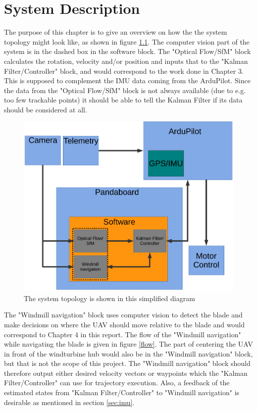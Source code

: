 \chapter{System Description}
The purpose of this chapter is to give an overview on how the the system topology might look like, as shown in figure \ref{overview}. The computer vision part of the system is in the dashed box in the software block. The "Optical Flow/SfM" block calculates the rotation, velocity and/or position and inputs that to the "Kalman Filter/Controller" block, and would correspond to the work done in Chapter 3. This is supposed to complement the IMU data coming from the ArduPilot. Since the data from the "Optical Flow/SfM" block is not always available (due to e.g. too few trackable points) it should be able to tell the Kalman Filter if its data should be considered at all.
\begin{figure}[ht!]
\centering
\includegraphics[scale=0.75]{./Chapter6/Pics/overview.pdf}
\caption[System Overview]{The system topology is shown in this simplified diagram}
\label{overview}
\end{figure}

The "Windmill navigation" block uses computer vision to detect the blade and make decisions on where the UAV should move relative to the blade and would correspond to Chapter 4 in this report. The flow of the "Windmill navigation" while navigating the blade is given in figure \ref{flow}. The part of centering the UAV in front of the windturbine hub would also be in the "Windmill navigation" block, but that is not the scope of this project. The "Windmill navigation" block should therefore output either desired velocity vectors or waypoints which the "Kalman Filter/Controller" can use for trajectory execution. Also, a feedback of the estimated states from "Kalman Filter/Controller" to "Windmill navigation" is desirable as mentioned in section \ref{sec:imu}.

